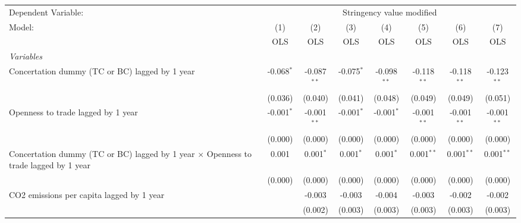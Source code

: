 
\begingroup
\centering
\begin{tabular}{lccccccc}
   \toprule
   Dependent Variable: & \multicolumn{7}{c}{Stringency value modified}\\
   Model:                                                                                      & (1)          & (2)           & (3)          & (4)           & (5)           & (6)           & (7)\\  
                                                                                               &  OLS         & OLS           & OLS          & OLS           & OLS           & OLS           & OLS\\  
   \midrule
   \emph{Variables}\\
   Concertation dummy (TC or BC) lagged by 1 year                                              & -0.068$^{*}$ & -0.087$^{**}$ & -0.075$^{*}$ & -0.098$^{**}$ & -0.118$^{**}$ & -0.118$^{**}$ & -0.123$^{**}$\\   
                                                                                               & (0.036)      & (0.040)       & (0.041)      & (0.048)       & (0.049)       & (0.049)       & (0.051)\\   
   Openness to trade lagged by 1 year                                                          & -0.001$^{*}$ & -0.001$^{**}$ & -0.001$^{*}$ & -0.001$^{*}$  & -0.001$^{**}$ & -0.001$^{**}$ & -0.001$^{**}$\\   
                                                                                               & (0.000)      & (0.000)       & (0.000)      & (0.000)       & (0.000)       & (0.000)       & (0.000)\\   
   Concertation dummy (TC or BC) lagged by 1 year $\times$ Openness to trade lagged by 1 year  & 0.001        & 0.001$^{*}$   & 0.001$^{*}$  & 0.001$^{*}$   & 0.001$^{**}$  & 0.001$^{**}$  & 0.001$^{**}$\\   
                                                                                               & (0.000)      & (0.000)       & (0.000)      & (0.000)       & (0.000)       & (0.000)       & (0.000)\\   
   CO2 emissions per capita lagged by 1 year                                                   &              & -0.003        & -0.003       & -0.004        & -0.003        & -0.002        & -0.002\\   
                                                                                               &              & (0.002)       & (0.003)      & (0.003)       & (0.003)       & (0.003)       & (0.003)\\   

\end{tabular}
